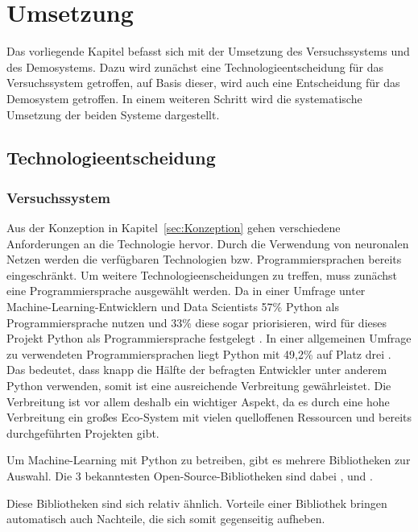 \section{Umsetzung}

Das vorliegende Kapitel befasst sich mit der Umsetzung des Versuchssystems und des Demosystems.
Dazu wird zunächst eine Technologieentscheidung für das Versuchssystem getroffen, auf Basis dieser, wird auch eine Entscheidung für das Demosystem getroffen.
In einem weiteren Schritt wird die systematische Umsetzung der beiden Systeme dargestellt.

\subsection{Technologieentscheidung}
\subsubsection{Versuchssystem}\label{sec:TechnologieVersuchssystem}
Aus der Konzeption in Kapitel~\ref{sec:Konzeption} gehen verschiedene Anforderungen an die Technologie hervor.
Durch die Verwendung von neuronalen Netzen werden die verfügbaren Technologien bzw. Programmiersprachen bereits eingeschränkt.
Um weitere Technologieenscheidungen zu treffen, muss zunächst eine Programmiersprache ausgewählt werden.
Da in einer Umfrage unter Machine-Learning-Entwicklern und Data Scientists 57\% Python als Programmiersprache nutzen und 33\% diese sogar priorisieren, wird für dieses Projekt Python als Programmiersprache festgelegt \autocite[vgl. ][S. 16]{vision_mobile_state_2017}.
In einer allgemeinen Umfrage zu verwendeten Programmiersprachen liegt Python mit 49,2\% auf Platz drei \autocite[vgl.][]{yepis_2023_2023}.
Das bedeutet, dass knapp die Hälfte der befragten Entwickler unter anderem Python verwenden, somit ist eine ausreichende Verbreitung gewährleistet.
Die Verbreitung ist vor allem deshalb ein wichtiger Aspekt, da es durch eine hohe Verbreitung ein großes Eco-System mit vielen quelloffenen Ressourcen und bereits durchgeführten Projekten gibt.

Um Machine-Learning mit Python zu betreiben, gibt es mehrere Bibliotheken zur Auswahl.
Die 3 bekanntesten Open-Source-Bibliotheken sind dabei ,  und  \autocite[vgl.][]{msv_tensorflow_2020}.

Diese Bibliotheken sind sich relativ ähnlich.
Vorteile einer Bibliothek bringen automatisch auch Nachteile, die sich somit gegenseitig aufheben.

